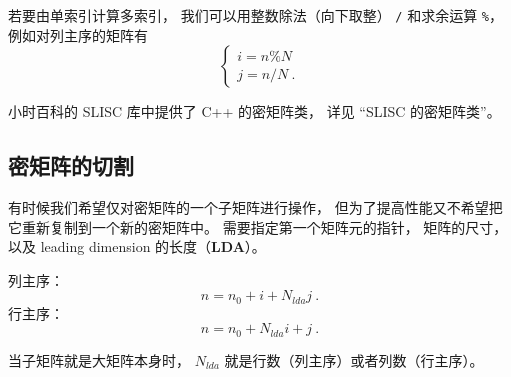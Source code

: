 若要由单索引计算多索引， 我们可以用整数除法（向下取整） \verb|/| 和求余运算 \verb|%|， 例如对列主序的矩阵有
\begin{equation}
\begin{cases}
i = n \% N\\
j = n / N~.
\end{cases}
\end{equation}

小时百科的 SLISC 库中提供了 C++ 的密矩阵类， 详见 “SLISC 的密矩阵类”。

\subsection{密矩阵的切割}
有时候我们希望仅对密矩阵的一个子矩阵进行操作， 但为了提高性能又不希望把它重新复制到一个新的密矩阵中。
需要指定第一个矩阵元的指针， 矩阵的尺寸， 以及 leading dimension 的长度（\textbf{LDA}）。

列主序： 
\begin{equation}
n = n_0 + i + N_{lda} j~.
\end{equation}
行主序：
\begin{equation}
n = n_0 + N_{lda} i + j~.
\end{equation}

当子矩阵就是大矩阵本身时， $N_{lda}$ 就是行数（列主序）或者列数（行主序）。
